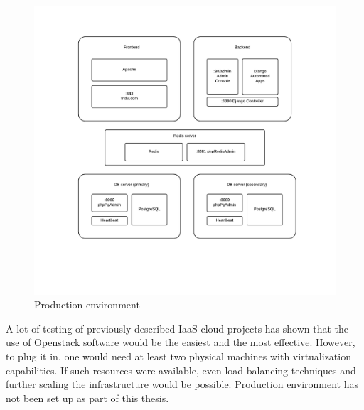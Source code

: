 \documentclass[thesis=B,english]{FITthesis}[2013/04/26]
\begin{document}
\begin{figure}[h!]
	\includegraphics[trim=2.5cm 2cm 2.5cm 2cm, clip=true, totalheight=390pt]{images/tndw-prod.pdf}
	\caption{Production environment}
	\label{fig:tndw-prod}
\end{figure}

A lot of testing of previously described IaaS cloud projects has shown that the use of Openstack software would be the easiest and the most effective. However, to plug it in, one would need at least two physical machines with virtualization capabilities. If such resources were available, even load balancing techniques and further scaling the infrastructure would be possible. Production environment has not been set up as part of this thesis.
\end{document}
